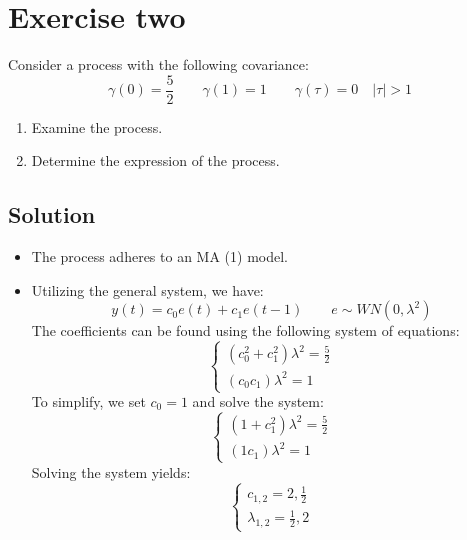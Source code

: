 \section{Exercise two}

Consider a process with the following covariance:
\[\gamma(0)=\dfrac{5}{2}\qquad\gamma(1)=1\qquad\gamma(\tau)=0 \quad \left\lvert \tau \right\rvert > 1\]
\begin{enumerate}
    \item Examine the process.
    \item Determine the expression of the process.
\end{enumerate}

\subsection*{Solution}
\begin{itemize}
    \item The process adheres to an MA (1) model.
    \item Utilizing the general system, we have:
        \[y(t)=c_0e(t)+c_1e(t-1)\qquad e\sim WN(0,\lambda^2)\]
        The coefficients can be found using the following system of equations:
        \[\begin{cases}
            \left(c_0^2+c_1^2\right)\lambda^2 = \frac{5}{2} \\
            \left(c_0c_1\right)\lambda^2= 1
        \end{cases}\]
        To simplify, we set $c_0=1$ and solve the system:
        \[\begin{cases}
            \left(1+c_1^2\right)\lambda^2 = \frac{5}{2} \\
            \left(1c_1\right)\lambda^2= 1
        \end{cases}\]
        Solving the system yields:
        \[\begin{cases}
            c_{1,2} = 2, \frac{1}{2} \\
            \lambda_{1,2} = \frac{1}{2}, 2
        \end{cases}\]
\end{itemize}